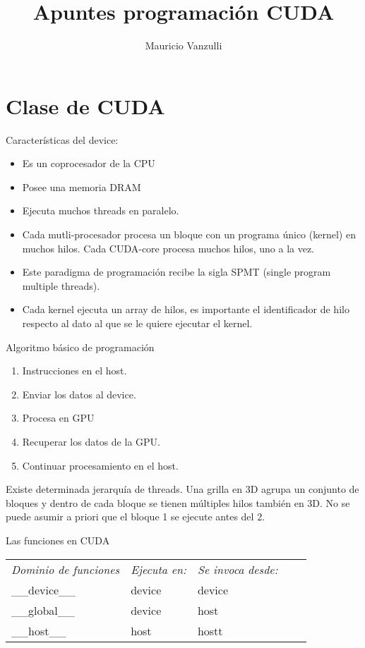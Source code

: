 \documentclass[]{scrartcl}
\title{Apuntes programación CUDA}
\author{Mauricio Vanzulli}
\begin{document}
\maketitle


\section{Clase de CUDA}

Características del device:

\begin{itemize}
	\item Es un coprocesador de la CPU
	\item Posee una memoria DRAM
	\item Ejecuta muchos threads en paralelo.
	\item Cada mutli-procesador procesa un bloque con un programa único (kernel) en muchos hilos. Cada CUDA-core procesa muchos hilos, uno a la vez.
	\item Este paradigma de programación recibe la sigla SPMT (single program multiple threads).
	\item Cada kernel ejecuta un array de hilos, es importante el identificador de hilo respecto al dato al que se le quiere ejecutar el kernel.
\end{itemize}

Algoritmo básico de programación
\begin{enumerate}
	\item Instrucciones en el host.
	\item Enviar los datos al device.
	\item Procesa en GPU
	\item Recuperar los datos de la GPU.
	\item Continuar procesamiento en el host.
\end{enumerate}

Existe determinada jerarquía de threads. Una grilla en 3D agrupa un conjunto de bloques y dentro de cada bloque se tienen múltiples hilos también en 3D. No se puede asumir a priori que el bloque 1 se ejecute antes del 2.

\pagebreak
Las funciones en CUDA 


\begin{table}[ht]
	\begin{tabular}{|l|l|l|ll}
		\cline{1-3}
		\textit{Dominio de funciones} & \textit{Ejecuta en:} & \textit{Se invoca desde:} & \textit{} &  \\ \cline{1-3}
		\_\_device\_\_   & device               & device                    &           &  \\ \cline{1-3}
		\_\_global\_\_   & device               & host                      &           &  \\ \cline{1-3}
		\_\_host\_\_     & host                 & hostt                     &           &  \\ \cline{1-3}
	\end{tabular}
\end{table}
\end{document}
